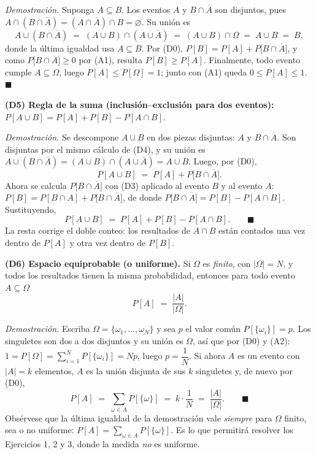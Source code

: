 \documentclass[11pt]{article}
\begin{document}
\begin{teo}
\emph{Demostración.} Suponga $A\subseteq B$. Los eventos $A$ y $B\cap\overline{A}$ son
disjuntos, pues $A\cap(B\cap\overline{A})=(A\cap\overline{A})\cap B=\varnothing$. Su unión es
\[
A\cup(B\cap\overline{A}) \;=\; (A\cup B)\cap(A\cup\overline{A}) \;=\; (A\cup B)\cap\Omega
\;=\; A\cup B \;=\; B ,
\]
donde la última igualdad usa $A\subseteq B$. Por (D0), $P[B]=P[A]+P\big[B\cap\overline{A}\big]$,
y como $P\big[B\cap\overline{A}\big]\ge 0$ por (A1), resulta $P[B]\ge P[A]$. Finalmente, todo
evento cumple $A\subseteq\Omega$, luego $P[A]\le P[\Omega]=1$; junto con (A1) queda
$0\le P[A]\le 1$. $\blacksquare$

\medskip
\textbf{(D5) Regla de la suma (inclusión--exclusión para dos eventos):}
$P[A\cup B]=P[A]+P[B]-P[A\cap B]$.

\emph{Demostración.} Se descompone $A\cup B$ en dos piezas disjuntas: $A$ y $B\cap\overline{A}$.
Son disjuntas por el mismo cálculo de (D4), y su unión es
$A\cup(B\cap\overline{A})=(A\cup B)\cap(A\cup\overline{A})=A\cup B$. Luego, por (D0),
\[
P[A\cup B] \;=\; P[A]+P\big[B\cap\overline{A}\big].
\]
Ahora se calcula $P\big[B\cap\overline{A}\big]$ con (D3) aplicado al evento $B$ y al evento $A$:
$P[B]=P[B\cap A]+P\big[B\cap\overline{A}\big]$, de donde
$P\big[B\cap\overline{A}\big]=P[B]-P[A\cap B]$. Sustituyendo,
\[
P[A\cup B] \;=\; P[A]+P[B]-P[A\cap B]. \qquad\blacksquare
\]
La resta corrige el doble conteo: los resultados de $A\cap B$ están contados una vez dentro de
$P[A]$ y otra vez dentro de $P[B]$.

\medskip
\textbf{(D6) Espacio equiprobable (o uniforme).} Si $\Omega$ es \emph{finito}, con
$|\Omega|=N$, y todos los resultados tienen la misma probabilidad, entonces para todo evento
$A\subseteq\Omega$
\[
P[A] \;=\; \frac{|A|}{|\Omega|}.
\]

\emph{Demostración.} Escriba $\Omega=\{\omega_1,\dots,\omega_N\}$ y sea $p$ el valor común
$P[\{\omega_i\}]=p$. Los singuletes son dos a dos disjuntos y su unión es $\Omega$, así que por
(D0) y (A2): $1=P[\Omega]=\sum_{i=1}^{N}P[\{\omega_i\}]=Np$, luego $p=\dfrac{1}{N}$. Si ahora
$A$ es un evento con $|A|=k$ elementos, $A$ es la unión disjunta de sus $k$ singuletes y, de
nuevo por (D0),
\[
P[A]\;=\;\sum_{\omega\in A}P[\{\omega\}] \;=\; k\cdot\frac{1}{N} \;=\; \frac{|A|}{|\Omega|}.
\qquad\blacksquare
\]
Obsérvese que la última igualdad de la demostración vale \emph{siempre} para $\Omega$ finito,
sea o no uniforme: $P[A]=\sum_{\omega\in A}P[\{\omega\}]$. Es lo que permitirá resolver los
Ejercicios 1, 2 y 3, donde la medida \emph{no} es uniforme.
\end{teo}
\end{document}
